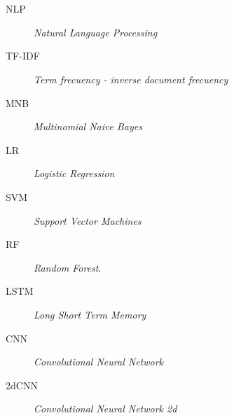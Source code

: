 \chapter*{\nomeglosarioacronimos}
\label{chap:acronimos}
\thispagestyle{plain}
\fancyhead{}


\begin{description}
\item [NLP] \emph{Natural Language Processing}
\item [TF-IDF] \emph{Term frecuency - inverse document frecuency}
\item [MNB] \emph{Multinomial Naive Bayes}
\item [LR] \emph {Logistic Regression}
\item [SVM] \emph {Support Vector Machines}
 \item [RF] \emph{Random Forest}.
 \item[LSTM] \emph{Long Short Term Memory}
 \item[CNN] \emph{Convolutional Neural Network}
 	\item[2dCNN] \emph{Convolutional Neural Network 2d}
\end{description}

